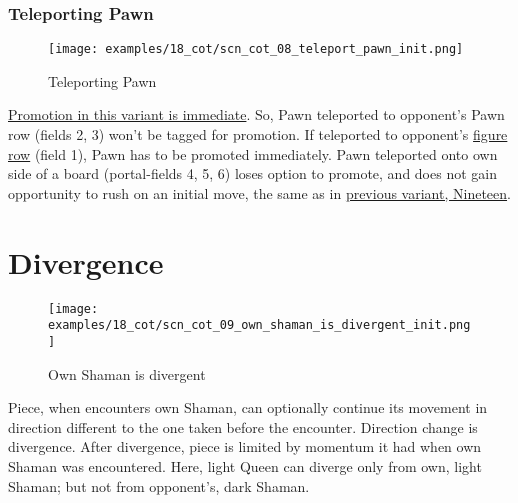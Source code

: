 \subsubsection*{Teleporting Pawn}
\label{sec:Conquest of Tlalocan/Shaman/Movement/Teleporting Pawn}

\vspace*{-1.4\baselineskip}
\noindent
\begin{figure}[!h]
\texttt{[image: examples/18\_cot/scn\_cot\_08\_teleport\_pawn\_init.png]}
\caption{Teleporting Pawn}
\label{fig:scn_cot_08_teleport_pawn_init}
\end{figure}

\hyperref[sec:Conquest of Tlalocan/Promotion]{Promotion in this variant is immediate}.
So, Pawn teleported to opponent's Pawn row (fields 2, 3) won't be tagged for promotion.
If teleported to opponent's \hyperref[sec:Terms/Figure row]{figure row} (field 1),
Pawn has to be promoted immediately.
Pawn teleported onto own side of a board (portal-fields 4, 5, 6) loses option to
promote, and does not gain opportunity to rush on an initial move, the same as in
\hyperref[fig:scn_n_12_teleport_pawns_step_1]{previous variant, Nineteen}.

\clearpage %

\section*{Divergence}
\label{sec:Conquest of Tlalocan/Divergence}

\vspace*{-1.4\baselineskip}
\noindent
\begin{figure}[!h]
\texttt{[image: examples/18\_cot/scn\_cot\_09\_own\_shaman\_is\_divergent\_init.png]}
\vspace*{-1.3\baselineskip}
\caption{Own Shaman is divergent}
\label{fig:scn_cot_09_own_shaman_is_divergent_init}
\end{figure}

\vspace*{-0.5\baselineskip}
Piece, when encounters own Shaman, can optionally continue its movement in direction
different to the one taken before the encounter. Direction change is divergence. After
divergence, piece is limited by momentum it had when own Shaman was encountered. \newline
\indent
Here, light Queen can diverge only from own, light Shaman; but not from opponent's,
dark Shaman.

